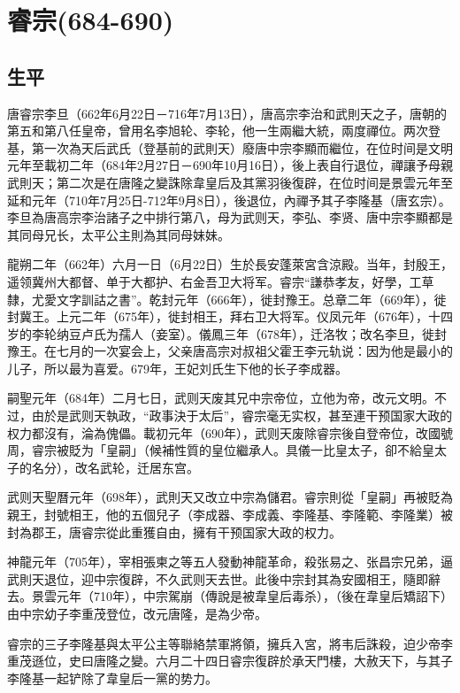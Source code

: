 
\section{睿宗\tiny(684-690)}

\subsection{生平}

唐睿宗李旦（662年6月22日－716年7月13日），唐高宗李治和武則天之子，唐朝的第五和第八任皇帝，曾用名李旭轮、李轮，他一生兩繼大統，兩度禪位。两次登基，第一次為天后武氏（登基前的武則天）廢唐中宗李顯而繼位，在位时间是文明元年至載初二年（684年2月27日－690年10月16日），後上表自行退位，禪讓予母親武則天；第二次是在唐隆之變誅除韋皇后及其黨羽後復辟，在位时间是景雲元年至延和元年（710年7月25日-712年9月8日），後退位，內禪予其子李隆基（唐玄宗）。李旦為唐高宗李治諸子之中排行第八，母为武则天，李弘、李贤、唐中宗李顯都是其同母兄长，太平公主則為其同母妹妹。

龍朔二年（662年）六月一日（6月22日）生於長安蓬萊宮含涼殿。当年，封殷王，遥领冀州大都督、单于大都护、右金吾卫大将军。睿宗“謙恭孝友，好學，工草隸，尤愛文字訓詁之書”。乾封元年（666年），徙封豫王。总章二年（669年），徙封冀王。上元二年（675年），徙封相王，拜右卫大将军。仪凤元年（676年），十四岁的李轮纳豆卢氏为孺人（妾室）。儀鳳三年（678年），迁洛牧；改名李旦，徙封豫王。在七月的一次宴会上，父亲唐高宗对叔祖父霍王李元轨说：因为他是最小的儿子，所以最为喜爱。679年，王妃刘氏生下他的长子李成器。

嗣聖元年（684年）二月七日，武则天废其兄中宗帝位，立他为帝，改元文明。不过，由於是武则天執政，“政事決于太后”，睿宗毫无实权，甚至連干预国家大政的权力都沒有，淪為傀儡。載初元年（690年），武则天废除睿宗後自登帝位，改國號周，睿宗被貶为「皇嗣」（候補性質的皇位繼承人。具儀一比皇太子，卻不給皇太子的名分），改名武轮，迁居东宫。

武则天聖曆元年（698年），武則天又改立中宗為儲君。睿宗則從「皇嗣」再被貶為親王，封號相王，他的五個兒子（李成器、李成義、李隆基、李隆範、李隆業）被封為郡王，唐睿宗從此重獲自由，擁有干预国家大政的权力。

神龍元年（705年），宰相張柬之等五人發動神龍革命，殺张易之、张昌宗兄弟，逼武則天退位，迎中宗復辟，不久武则天去世。此後中宗封其為安國相王，隨即辭去。景雲元年（710年），中宗駕崩（傳說是被韋皇后毒杀），（後在韋皇后矯詔下）由中宗幼子李重茂登位，改元唐隆，是為少帝。

睿宗的三子李隆基與太平公主等聯絡禁軍將領，擁兵入宮，將韦后誅殺，迫少帝李重茂遜位，史曰唐隆之變。六月二十四日睿宗復辟於承天門樓，大赦天下，与其子李隆基一起铲除了韋皇后一黨的势力。

